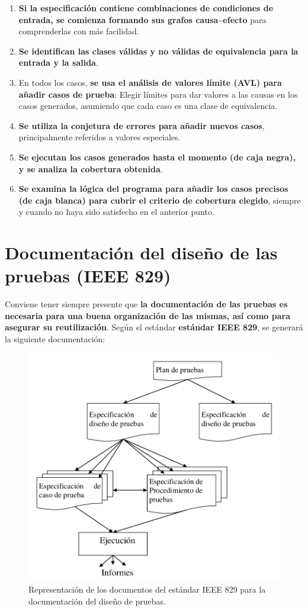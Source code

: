 \begin{enumerate}
    \item \textbf{Si la especificación contiene combinaciones de condiciones de entrada, se comienza formando sus grafos causa--efecto} para comprenderlas con más facilidad.
    \item \textbf{Se identifican las clases válidas y no válidas de equivalencia para la entrada y la salida}.
    \item En todos los casos, \textbf{se usa el análisis de valores límite (AVL) para añadir casos de prueba}: Elegir límites para dar valores a las causas en los casos generados, asumiendo que cada caso es una clase de equivalencia.
    \item \textbf{Se utiliza la conjetura de errores para añadir nuevos casos}, principalmente referidos a valores especiales.
    \item \textbf{Se ejecutan los casos generados hasta el momento (de caja negra), y se analiza la cobertura obtenida}.
    \item \textbf{Se examina la lógica del programa para añadir los casos precisos (de caja blanca) para cubrir el criterio de cobertura elegido}, siempre y cuando no haya sido satisfecho en el anterior punto.
\end{enumerate}


\section{Documentación del diseño de las pruebas (IEEE 829)}

Conviene tener siempre presente que \textbf{la documentación de las pruebas es necesaria para una buena organización de las mismas, así como para asegurar su reutilización}. Según el estándar \textbf{estándar IEEE 829}, se generará la siguiente documentación:

\begin{figure}[H]
    \centering
    \includegraphics[width=0.6\linewidth]{Resources/Tema6/IEEE_829.png}
    \caption{Representación de los documentos del estándar IEEE 829 para la documentación del diseño de pruebas.}
    \label{fig:IEEE829}
\end{figure}

